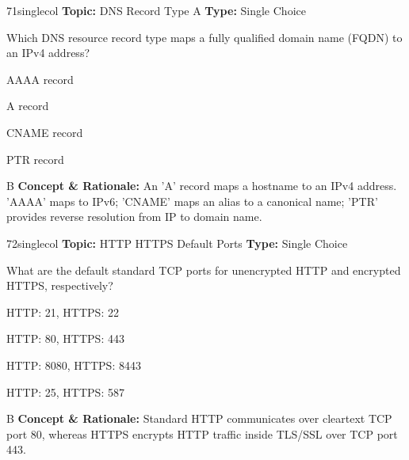 \begin{qcard}{71}{singlecol}
\textcolor{darkslate!75}{\small\textbf{Topic:} DNS Record Type A \hfill \textbf{Type:} Single Choice}\vspace{0.4em}\par
Which DNS resource record type maps a fully qualified domain name (FQDN) to an IPv4 address?
\begin{qoptions}
\item AAAA record
\item A record
\item CNAME record
\item PTR record
\end{qoptions}
\end{qcard}
\nopagebreak
\begin{explainbox}{B}
\textbf{Concept \& Rationale:} An 'A' record maps a hostname to an IPv4 address. 'AAAA' maps to IPv6; 'CNAME' maps an alias to a canonical name; 'PTR' provides reverse resolution from IP to domain name.
\end{explainbox}

\begin{qcard}{72}{singlecol}
\textcolor{darkslate!75}{\small\textbf{Topic:} HTTP HTTPS Default Ports \hfill \textbf{Type:} Single Choice}\vspace{0.4em}\par
What are the default standard TCP ports for unencrypted HTTP and encrypted HTTPS, respectively?
\begin{qoptions}
\item HTTP: 21, HTTPS: 22
\item HTTP: 80, HTTPS: 443
\item HTTP: 8080, HTTPS: 8443
\item HTTP: 25, HTTPS: 587
\end{qoptions}
\end{qcard}
\nopagebreak
\begin{explainbox}{B}
\textbf{Concept \& Rationale:} Standard HTTP communicates over cleartext TCP port 80, whereas HTTPS encrypts HTTP traffic inside TLS/SSL over TCP port 443.
\end{explainbox}

